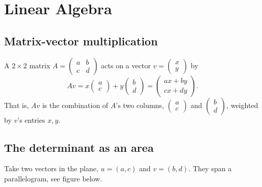 \chapter{Linear Algebra}

\section{Matrix-vector multiplication}

A $2\times 2$ matrix $A=\begin{pmatrix}a&b\\c&d\end{pmatrix}$ acts on
a vector $v=\begin{pmatrix}x\\y\end{pmatrix}$ by
\[
Av = x\begin{pmatrix}a\\c\end{pmatrix} + y\begin{pmatrix}b\\d\end{pmatrix}
= \begin{pmatrix}ax+by\\cx+dy\end{pmatrix}.
\]
That is, $Av$ is the combination of $A$'s two columns,
$\begin{pmatrix}a\\c\end{pmatrix}$ and
  $\begin{pmatrix}b\\d\end{pmatrix}$, weighted by $v$'s entries $x,y$.
   
\section{The determinant as an area}

Take two vectors in the plane, $u=(a,c)$ and $v=(b,d)$. They span a
parallelogram, see figure below.

\begin{center}
\end{center}

